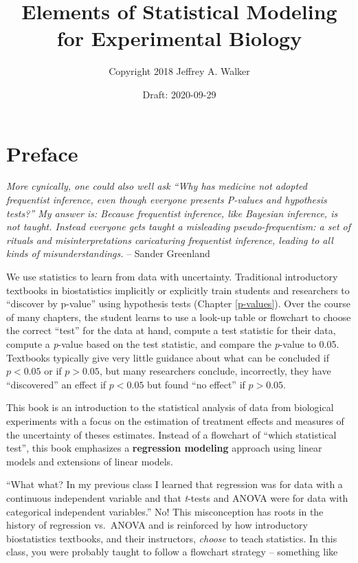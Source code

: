 \documentclass[]{book}
\title{Elements of Statistical Modeling for Experimental Biology}
\author{Copyright 2018 Jeffrey A. Walker}
\date{Draft: 2020-09-29}
\begin{document}
\maketitle

{
\setcounter{tocdepth}{1}
\tableofcontents
}
\hypertarget{preface}{%
\chapter*{Preface}\label{preface}}

\emph{More cynically, one could also well ask ``Why has medicine not adopted frequentist inference, even though everyone presents P-values and hypothesis tests?'' My answer is: Because frequentist inference, like Bayesian inference, is not taught. Instead everyone gets taught a misleading pseudo-frequentism: a set of rituals and misinterpretations caricaturing frequentist inference, leading to all kinds of misunderstandings.} -- Sander Greenland

We use statistics to learn from data with uncertainty. Traditional introductory textbooks in biostatistics implicitly or explicitly train students and researchers to ``discover by p-value'' using hypothesis tests (Chapter \ref{p-values}). Over the course of many chapters, the student learns to use a look-up table or flowchart to choose the correct ``test'' for the data at hand, compute a test statistic for their data, compute a \emph{p}-value based on the test statistic, and compare the \emph{p}-value to 0.05. Textbooks typically give very little guidance about what can be concluded if \(p < 0.05\) or if \(p > 0.05\), but many researchers conclude, incorrectly, they have ``discovered'' an effect if \(p < 0.05\) but found ``no effect'' if \(p > 0.05\).

This book is an introduction to the statistical analysis of data from biological experiments with a focus on the estimation of treatment effects and measures of the uncertainty of theses estimates. Instead of a flowchart of ``which statistical test'', this book emphasizes a \textbf{regression modeling} approach using linear models and extensions of linear models.

``What what? In my previous class I learned that regression was for data with a continuous independent variable and that \emph{t}-tests and ANOVA were for data with categorical independent variables.'' No! This misconception has roots in the history of regression vs.~ANOVA and is reinforced by how introductory biostatistics textbooks, and their instructors, \emph{choose} to teach statistics. In this class, you were probably taught to follow a flowchart strategy -- something like
\end{document}
